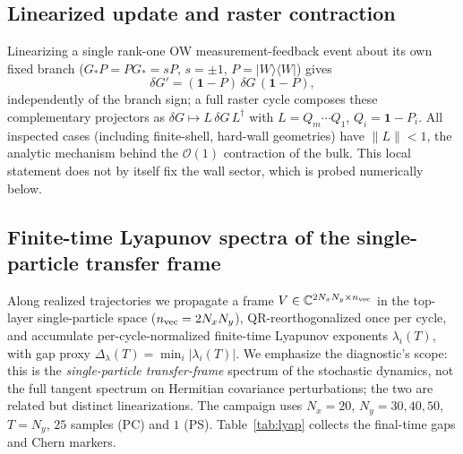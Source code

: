 \documentclass[aps,prl,onecolumn,superscriptaddress,nofootinbib]{revtex4-2}
\newcommand{\Dlam}{\Delta_{\lambda}}
\newcommand{\ket}[1]{|#1\rangle}
\newcommand{\bra}[1]{\langle#1|}
\begin{document}
\subsection{Linearized update and raster contraction}

Linearizing a single rank-one OW measurement-feedback event about its own fixed branch ($G_\ast P=PG_\ast=sP$, $s=\pm1$, $P=\ket{W}\bra{W}$) gives
\begin{equation}
  \delta G'=(\mathbf{1}-P)\,\delta G\,(\mathbf{1}-P),
  \label{eq:sm-rank1}
\end{equation}
independently of the branch sign; a full raster cycle composes these complementary projectors as $\delta G\mapsto L\,\delta G\,L^\dagger$ with $L=Q_m\cdots Q_1$, $Q_i=\mathbf{1}-P_i$.  All inspected cases (including finite-shell, hard-wall geometries) have $\|L\|<1$, the analytic mechanism behind the $\mathcal{O}(1)$ contraction of the bulk.  This local statement does not by itself fix the wall sector, which is probed numerically below.

\subsection{Finite-time Lyapunov spectra of the single-particle transfer frame}

Along realized trajectories we propagate a frame $V\in\mathbb{C}^{2N_xN_y\times n_{\rm vec}}$ in the top-layer single-particle space ($n_{\rm vec}=2N_xN_y$), QR-reorthogonalized once per cycle, and accumulate per-cycle-normalized finite-time Lyapunov exponents $\lambda_i(T)$, with gap proxy $\Dlam(T)=\min_i|\lambda_i(T)|$.  We emphasize the diagnostic's scope: this is the \emph{single-particle transfer-frame} spectrum of the stochastic dynamics, not the full tangent spectrum on Hermitian covariance perturbations; the two are related but distinct linearizations.  The campaign uses $N_x=20$, $N_y=30,40,50$, $T=N_y$, $25$ samples (PC) and $1$ (PS).  Table~\ref{tab:lyap} collects the final-time gaps and Chern markers.
\end{document}
